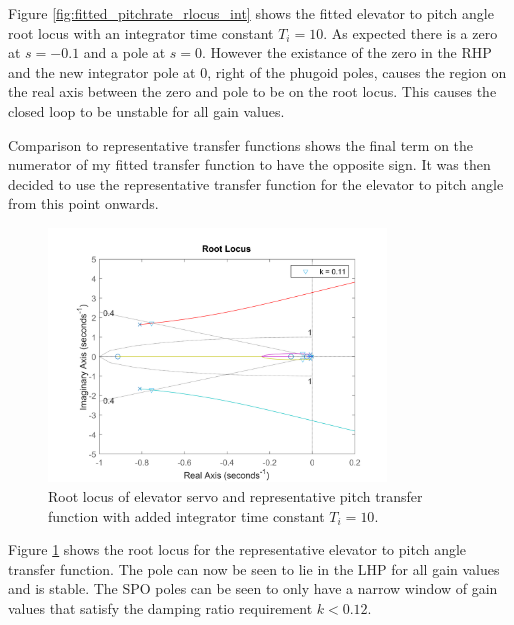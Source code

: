 \documentclass{article}
\begin{document}
Figure \ref{fig:fitted_pitchrate_rlocus_int} shows the fitted elevator to pitch angle root locus with an integrator time constant $T_i = 10$.
As expected there is a zero at $s=-0.1$ and a pole at $s=0$.
However the existance of the zero in the RHP and the new integrator pole at 0, right of the phugoid poles, causes the region on the real axis between the zero and pole to be on the root locus.
This causes the closed loop to be unstable for all gain values.

Comparison to representative transfer functions \cite{rep} shows the final term on the numerator of my fitted transfer function to have the opposite sign.
It was then decided to use the representative transfer function for the elevator to pitch angle from this point onwards.

\begin{figure}[H]
    \centering
    \includegraphics[width=0.8\textwidth]{figures/pitch_autopilot_locus_Ti10.png}
    \caption{Root locus of elevator servo and representative pitch transfer function \cite{rep} with added integrator time constant $T_i = 10$.}
    \label{fig:representative_pitchrate_rlocus_int}
\end{figure}

Figure \ref{fig:representative_pitchrate_rlocus_int} shows the root locus for the representative elevator to pitch angle transfer function.
The pole can now be seen to lie in the LHP for all gain values and is stable.
The SPO poles can be seen to only have a narrow window of gain values that satisfy the damping ratio requirement $k < 0.12$.
\end{document}
